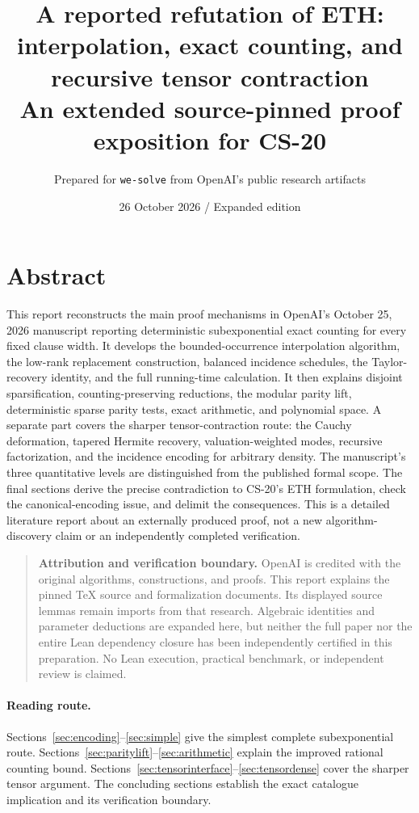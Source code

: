 \documentclass[11pt,a4paper]{article}
\title{A reported refutation of ETH:\\interpolation, exact counting, and recursive tensor contraction\\
\large An extended source-pinned proof exposition for CS-20}
\author{Prepared for \texttt{we-solve} from OpenAI's public research artifacts}
\date{26 October 2026 \quad / \quad Expanded edition}
\numberwithin{equation}{section}
\theoremstyle{definition}
\theoremstyle{remark}
\newcommand{\statusbox}[1]{\begin{quote}\small\noindent\textbf{Attribution and verification boundary.} #1\end{quote}}
\begin{document}
\maketitle
\section*{Abstract}
This report reconstructs the main proof mechanisms in OpenAI's October 25,
2026 manuscript reporting deterministic subexponential exact counting for every
fixed clause width. It develops the bounded-occurrence interpolation algorithm,
the low-rank replacement construction, balanced incidence schedules, the
Taylor-recovery identity, and the full running-time calculation. It then explains
disjoint sparsification, counting-preserving reductions, the modular parity
lift, deterministic sparse parity tests, exact arithmetic, and polynomial space.
A separate part covers the sharper tensor-contraction route: the Cauchy
deformation, tapered Hermite recovery, valuation-weighted modes, recursive
factorization, and the incidence encoding for arbitrary density. The manuscript's
three quantitative levels are distinguished from the published formal scope.
The final sections derive the precise contradiction to CS-20's ETH formulation,
check the canonical-encoding issue, and delimit the consequences. This is a
detailed literature report about an externally produced proof, not a new
algorithm-discovery claim or an independently completed verification.

\statusbox{OpenAI is credited with the original algorithms, constructions, and
proofs. This report explains the pinned TeX source and formalization documents.
Its displayed source lemmas remain imports from that research. Algebraic
identities and parameter deductions are expanded here, but neither the full
paper nor the entire Lean dependency closure has been independently certified
in this preparation. No Lean execution, practical benchmark, or independent
review is claimed.}
\paragraph{Reading route.}
Sections~\ref{sec:encoding}--\ref{sec:simple} give the simplest complete
subexponential route. Sections~\ref{sec:paritylift}--\ref{sec:arithmetic}
explain the improved rational counting bound. Sections~\ref{sec:tensorinterface}--\ref{sec:tensordense}
cover the sharper tensor argument. The concluding sections establish the
exact catalogue implication and its verification boundary.
\end{document}
